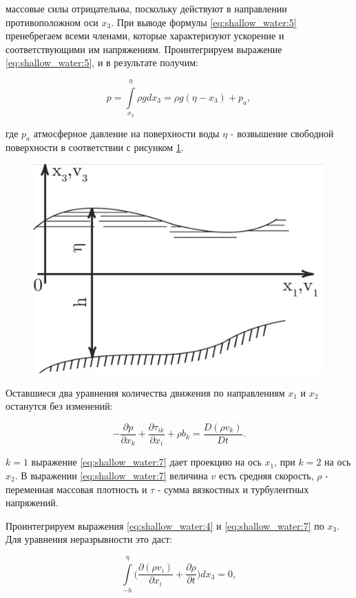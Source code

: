 \documentclass[14pt]{extreport}
\begin{document}
 массовые силы отрицательны, поскольку действуют в направлении противоположном оси $ x_3 $. При выводе формулы \ref{eq:shallow_water:5} пренебрегаем всеми членами, которые характеризуют ускорение и соответствующими им напряжениям. Проинтегрируем выражение \ref{eq:shallow_water:5}, и в результате получим:

\begin{equation}\label{eq:shallow_water:6}
p = \int\limits^\eta_{x_3} \rho g dx_3 = \rho g (\eta-x_3)+p_a,
\end{equation}

\noindent где $p_a$ атмосферное давление на поверхности воды
$\eta$ - возвышение свободной поверхности в соответствии с рисунком \ref{img:shallow_water:1}.

\begin{figure}[H]
\centerline{\includegraphics[width=0.5\linewidth]{images/shallow_water_1}}
\caption{}
\label{img:shallow_water:1}
\end{figure}


Оставшиеся два уравнения количества движения по направлениям $x_1$ и $x_2$ останутся без изменений:

\begin{equation}\label{eq:shallow_water:7}
-\frac{\partial p}{\partial x_k} + \frac{\partial \tau_{ik}}{\partial x_i} + \rho b_k = \frac{D(\rho v_k)}{Dt}.
\end{equation}

 $k=1$ выражение \ref{eq:shallow_water:7} дает проекцию на ось $x_1$, при $k=2$ на ось $x_2$. В выражении \ref{eq:shallow_water:7} величина $v$ есть средняя скорость, $\rho$ - переменная массовая плотность и $\tau$ - сумма вязкостных и турбулентных напряжений.

Проинтегрируем выражения \ref{eq:shallow_water:4} и \ref{eq:shallow_water:7} по $x_3$. Для уравнения неразрывности это даст:

\begin{equation}\label{eq:shallow_water:8}
\int\limits^\eta_{-h} \bigg(\frac{\partial (\rho v_i)}{\partial x_i} + \frac{\partial \rho}{\partial t}\bigg) dx_3 =0,
\end{equation}
\end{document}
